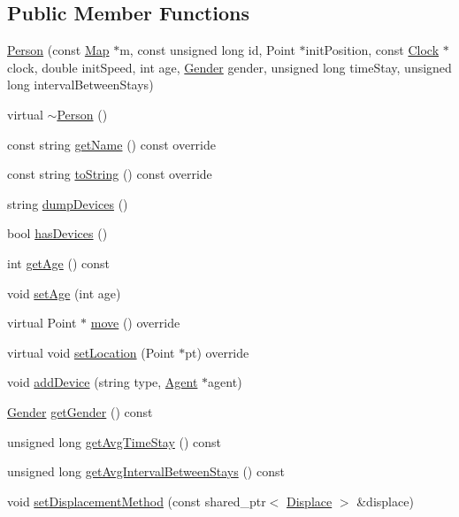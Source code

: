 \subsection*{Public Member Functions}
\begin{DoxyCompactItemize}
\item 
\hyperlink{class_person_a1fb64d7ef7c528d01dd09b2099b00e38}{Person} (const \hyperlink{class_map}{Map} $\ast$m, const unsigned long id, Point $\ast$init\+Position, const \hyperlink{class_clock}{Clock} $\ast$clock, double init\+Speed, int age, \hyperlink{class_person_aff84ca16bd4dbf364614d86f20b29dd2}{Gender} gender, unsigned long time\+Stay, unsigned long interval\+Between\+Stays)
\item 
virtual \hyperlink{class_person_a6b5729bb56531c93312b1179c8ee4b71}{$\sim$\+Person} ()
\item 
const string \hyperlink{class_person_aa2a6f8d7f1d94045a03ca578f2ed272c}{get\+Name} () const override
\item 
const string \hyperlink{class_person_a68872538da519d0a04297f43376db27c}{to\+String} () const override
\item 
string \hyperlink{class_person_a0bc06f77b3e8a151f8c5cc77459895c9}{dump\+Devices} ()
\item 
bool \hyperlink{class_person_a40d6f2c716dd3c9794067817a3fb9165}{has\+Devices} ()
\item 
int \hyperlink{class_person_a4b66dbee570398920b8fb6aacddd2559}{get\+Age} () const
\item 
void \hyperlink{class_person_ac8ade54c27a0657c987c395ff04a9d46}{set\+Age} (int age)
\item 
virtual Point $\ast$ \hyperlink{class_person_a922e0462a1e7eac6523a9a864ce27afc}{move} () override
\item 
virtual void \hyperlink{class_person_a05f4ac2107d59e03f0f336eda08aa358}{set\+Location} (Point $\ast$pt) override
\item 
void \hyperlink{class_person_a3ce0a72a98c2e723e48dcd7b4d9af599}{add\+Device} (string type, \hyperlink{class_agent}{Agent} $\ast$agent)
\item 
\hyperlink{class_person_aff84ca16bd4dbf364614d86f20b29dd2}{Gender} \hyperlink{class_person_adb5a4fabaaa6bf851de701aeb9df4fdf}{get\+Gender} () const
\item 
unsigned long \hyperlink{class_person_a2b01d9997db6f6d4555dbc5ac9898077}{get\+Avg\+Time\+Stay} () const
\item 
unsigned long \hyperlink{class_person_a59d3ea8e10928537043ee7b3d24a470c}{get\+Avg\+Interval\+Between\+Stays} () const
\item 
void \hyperlink{class_person_a89ada26d3541bc82e514dae833dc959d}{set\+Displacement\+Method} (const shared\+\_\+ptr$<$ \hyperlink{class_displace}{Displace} $>$ \&displace)
\end{DoxyCompactItemize}
